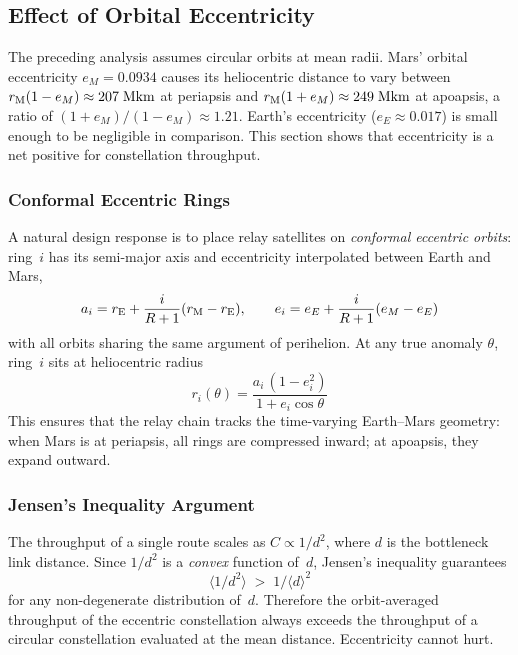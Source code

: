 \subsection{Effect of Orbital Eccentricity}
\label{sec:eccentricity}

The preceding analysis assumes circular orbits at mean radii. Mars' orbital
eccentricity $e_M = 0.0934$ causes its heliocentric distance to vary between
$r_{\mathrm{M}}(1-e_M) \approx 207\;\text{Mkm}$ at periapsis and
$r_{\mathrm{M}}(1+e_M) \approx 249\;\text{Mkm}$ at apoapsis, a ratio of
$(1+e_M)/(1-e_M) \approx 1.21$. Earth's eccentricity ($e_E \approx 0.017$) is
small enough to be negligible in comparison. This section shows that eccentricity
is a net positive for constellation throughput.

\subsubsection{Conformal Eccentric Rings}

A natural design response is to place relay satellites on \emph{conformal eccentric
orbits}: ring~$i$ has its semi-major axis and eccentricity interpolated between
Earth and Mars,
%
\begin{equation}
  a_i = r_{\mathrm{E}} + \frac{i}{R+1}(r_{\mathrm{M}} - r_{\mathrm{E}}), \qquad
  e_i = e_E + \frac{i}{R+1}(e_M - e_E)
\end{equation}
%
with all orbits sharing the same argument of perihelion. At any true anomaly
$\theta$, ring~$i$ sits at heliocentric radius
%
\begin{equation}
  r_i(\theta) = \frac{a_i\,(1 - e_i^2)}{1 + e_i\cos\theta}
\end{equation}
%
This ensures that the relay chain tracks the time-varying Earth--Mars geometry:
when Mars is at periapsis, all rings are compressed inward; at apoapsis, they
expand outward.

\subsubsection{Jensen's Inequality Argument}

The throughput of a single route scales as $C \propto 1/d^2$, where $d$ is the
bottleneck link distance. Since $1/d^2$ is a \emph{convex} function of~$d$,
Jensen's inequality guarantees
%
\begin{equation}
  \bigl\langle 1/d^2 \bigr\rangle \;>\; 1/\langle d \rangle^2
\end{equation}
%
for any non-degenerate distribution of~$d$. Therefore the orbit-averaged
throughput of the eccentric constellation always exceeds the throughput of a
circular constellation evaluated at the mean distance. Eccentricity cannot hurt.

